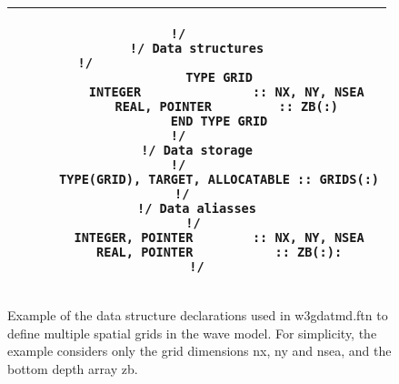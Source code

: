 \begin{figure}
\begin{center} \begin{tabular}{|c|} \hline 
\begin{minipage}[t]{4.5in}
\begin{verbatim}
!/     
!/ Data structures
!/                              
      TYPE GRID
        INTEGER               :: NX, NY, NSEA
        REAL, POINTER         :: ZB(:)
      END TYPE GRID
!/     
!/ Data storage
!/     
      TYPE(GRID), TARGET, ALLOCATABLE :: GRIDS(:)
!/    
!/ Data aliasses
!/ 
      INTEGER, POINTER        :: NX, NY, NSEA
      REAL, POINTER           :: ZB(:):
!/
\end{verbatim}
\end{minipage} \\ \hline
\end{tabular} \end{center}

\caption{Example of the data structure declarations used in {\file
         w3gdatmd.ftn} to define multiple spatial grids in the wave
         model. For simplicity, the example considers only the grid
         dimensions {\F nx}, {\F ny} and {\F nsea}, and the bottom
         depth array {\F zb}.}
\label{fig:struc_1}

\botline
\end{figure}
